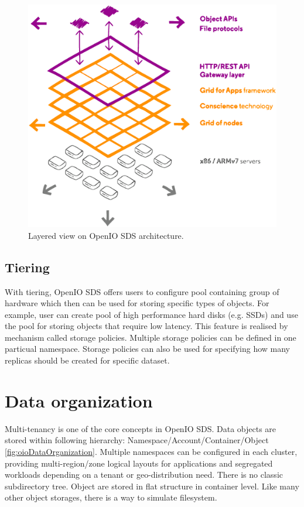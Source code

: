     \begin{figure}[hbt]
        \centering
        \includegraphics[width=1\textwidth]{obrazky-figures/openio-architecture.eps}
        \caption{Layered view on OpenIO SDS architecture.\cite{oioArch}}
        \label{fig:oioArch}
    \end{figure}


    \subsection*{Tiering}
    With tiering, OpenIO SDS offers users to configure pool containing group of hardware which then can be used for storing specific types of objects. For example, user can create pool of high performance hard disks (e.g. SSDs) and use the pool for storing objects that require low latency.
    This feature is realised by mechanism called storage policies. Multiple storage policies can be defined in one particual namespace. Storage policies can also be used for specifying how many replicas should be created for specific dataset\cite{oioCoreSolution}.

    \section{Data organization}
    Multi-tenancy is one of the core concepts in OpenIO SDS. Data objects are stored within following hierarchy: Namespace/Account/Container/Object \ref{fig:oioDataOrganization}. Multiple namespaces can be configured in each cluster, providing multi-region/zone logical layouts for applications and segregated workloads depending on a tenant or geo-distribution need\cite{oioSdsConcepts}.
    There is no classic subdirectory tree. Object are stored in flat structure in container level. Like many other object storages, there is a way to simulate filesystem.

